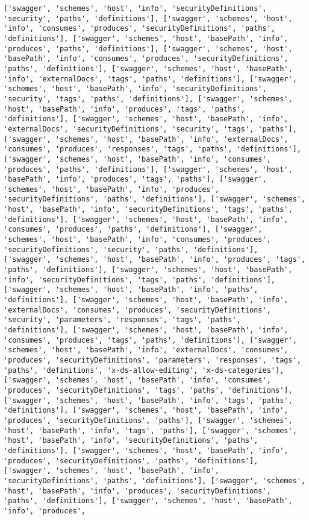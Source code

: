 \documentclass[11pt]{article}
\begin{document}
\begin{Verbatim}[commandchars=\\\{\}]
['swagger', 'schemes', 'host', 'info', 'securityDefinitions', 'security', 'paths', 'definitions'], ['swagger', 'schemes', 'host', 'info', 'consumes', 'produces', 'securityDefinitions', 'paths', 'definitions'], ['swagger', 'schemes', 'host', 'basePath', 'info', 'produces', 'paths', 'definitions'], ['swagger', 'schemes', 'host', 'basePath', 'info', 'consumes', 'produces', 'securityDefinitions', 'paths', 'definitions'], ['swagger', 'schemes', 'host', 'basePath', 'info', 'externalDocs', 'tags', 'paths', 'definitions'], ['swagger', 'schemes', 'host', 'basePath', 'info', 'securityDefinitions', 'security', 'tags', 'paths', 'definitions'], ['swagger', 'schemes', 'host', 'basePath', 'info', 'produces', 'tags', 'paths', 'definitions'], ['swagger', 'schemes', 'host', 'basePath', 'info', 'externalDocs', 'securityDefinitions', 'security', 'tags', 'paths'], ['swagger', 'schemes', 'host', 'basePath', 'info', 'externalDocs', 'consumes', 'produces', 'responses', 'tags', 'paths', 'definitions'], ['swagger', 'schemes', 'host', 'basePath', 'info', 'consumes', 'produces', 'paths', 'definitions'], ['swagger', 'schemes', 'host', 'basePath', 'info', 'produces', 'tags', 'paths'], ['swagger', 'schemes', 'host', 'basePath', 'info', 'produces', 'securityDefinitions', 'paths', 'definitions'], ['swagger', 'schemes', 'host', 'basePath', 'info', 'securityDefinitions', 'tags', 'paths', 'definitions'], ['swagger', 'schemes', 'host', 'basePath', 'info', 'consumes', 'produces', 'paths', 'definitions'], ['swagger', 'schemes', 'host', 'basePath', 'info', 'consumes', 'produces', 'securityDefinitions', 'security', 'paths', 'definitions'], ['swagger', 'schemes', 'host', 'basePath', 'info', 'produces', 'tags', 'paths', 'definitions'], ['swagger', 'schemes', 'host', 'basePath', 'info', 'securityDefinitions', 'tags', 'paths', 'definitions'], ['swagger', 'schemes', 'host', 'basePath', 'info', 'paths', 'definitions'], ['swagger', 'schemes', 'host', 'basePath', 'info', 'externalDocs', 'consumes', 'produces', 'securityDefinitions', 'security', 'parameters', 'responses', 'tags', 'paths', 'definitions'], ['swagger', 'schemes', 'host', 'basePath', 'info', 'consumes', 'produces', 'tags', 'paths', 'definitions'], ['swagger', 'schemes', 'host', 'basePath', 'info', 'externalDocs', 'consumes', 'produces', 'securityDefinitions', 'parameters', 'responses', 'tags', 'paths', 'definitions', 'x-ds-allow-editing', 'x-ds-categories'], ['swagger', 'schemes', 'host', 'basePath', 'info', 'consumes', 'produces', 'securityDefinitions', 'tags', 'paths', 'definitions'], ['swagger', 'schemes', 'host', 'basePath', 'info', 'tags', 'paths', 'definitions'], ['swagger', 'schemes', 'host', 'basePath', 'info', 'produces', 'securityDefinitions', 'paths'], ['swagger', 'schemes', 'host', 'basePath', 'info', 'tags', 'paths'], ['swagger', 'schemes', 'host', 'basePath', 'info', 'securityDefinitions', 'paths', 'definitions'], ['swagger', 'schemes', 'host', 'basePath', 'info', 'produces', 'securityDefinitions', 'paths', 'definitions'], ['swagger', 'schemes', 'host', 'basePath', 'info', 'securityDefinitions', 'paths', 'definitions'], ['swagger', 'schemes', 'host', 'basePath', 'info', 'produces', 'securityDefinitions', 'paths', 'definitions'], ['swagger', 'schemes', 'host', 'basePath', 'info', 'produces', 
\end{Verbatim}
\end{document}
